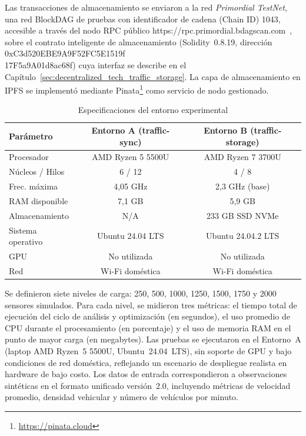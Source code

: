 Las transacciones de almacenamiento se enviaron a la red \textit{Primordial TestNet}, una
red BlockDAG de pruebas con identificador de cadena (Chain ID) 1043, accesible a través
del nodo RPC público https://rpc.primordial.bdagscan.com~\cite{wang2023dag}, sobre el
contrato inteligente de almacenamiento (Solidity~0.8.19, dirección
{\footnotesize 0xC3d520EBE9A9F52FC5E1519f\\17F5a9A01d8ac68f}) cuya interfaz se
describe en el Capítulo~\ref{sec:decentralized_tech_traffic_storage}. La capa de
almacenamiento en IPFS se implementó mediante Pinata\footnote{\url{https://pinata.cloud}}
como servicio de nodo gestionado.

\begin{table}[htbp]
\renewcommand{\arraystretch}{1.3}
\caption{Especificaciones del entorno experimental}
\label{tab:entorno_experimental}
\centering
\footnotesize
\begin{tabular}{lcc}
\hline
\textbf{Parámetro} & \textbf{Entorno A (traffic-sync)} & \textbf{Entorno B (traffic-storage)} \\
\hline
Procesador         & AMD Ryzen 5 5500U      & AMD Ryzen 7 3700U \\
Núcleos / Hilos    & 6 / 12                 & 4 / 8 \\
Frec. máxima       & 4,05 GHz               & 2,3 GHz (base) \\
RAM disponible     & 7,1 GB                 & 5,9 GB \\
Almacenamiento     & N/A                    & 233 GB SSD NVMe \\
Sistema operativo  & Ubuntu 24.04 LTS       & Ubuntu 24.04.2 LTS \\
GPU                & No utilizada           & No utilizada \\
Red                & Wi-Fi doméstica        & Wi-Fi doméstica \\
\hline
\end{tabular}
\end{table}

Se definieron siete niveles de carga: 250, 500, 1000, 1250, 1500, 1750 y 2000 sensores
simulados. Para cada nivel, se midieron tres métricas: el tiempo total de ejecución del
ciclo de análisis y optimización (en segundos), el uso promedio de CPU durante el procesamiento
(en porcentaje) y el uso de memoria RAM en el punto de mayor carga (en megabytes). Las pruebas
se ejecutaron en el Entorno~A (laptop AMD Ryzen~5 5500U, Ubuntu~24.04~LTS), sin soporte de GPU
y bajo condiciones de red doméstica, reflejando un escenario de despliegue realista en hardware
de bajo costo. Los datos de entrada correspondieron a observaciones sintéticas en el formato
unificado versión~2.0, incluyendo métricas de velocidad promedio, densidad vehicular y número
de vehículos por minuto.

